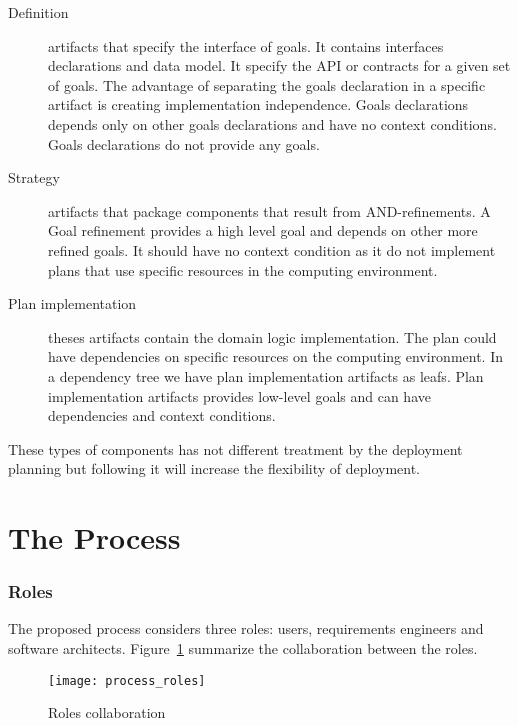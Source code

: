 \begin{description}
  \item[Definition] artifacts that specify the interface of goals. It contains interfaces declarations and data model. It specify the API or contracts for a given set of goals.
  The advantage of separating the goals declaration in a specific artifact is creating implementation independence.
  Goals declarations depends only on other goals declarations and have no context conditions. Goals declarations do not provide any goals.

  \item[Strategy] artifacts that package components that result from AND-refinements. A Goal refinement provides a high level goal and depends on other more refined goals. It should have no context condition as it do not implement plans that use specific resources in the computing environment.

  \item[Plan implementation] theses artifacts contain the domain logic implementation. The plan could have dependencies on specific resources on the computing environment. In a dependency tree we have plan implementation artifacts as leafs.
  Plan implementation artifacts provides low-level goals and can have dependencies and context conditions.

\end{description}

These types of components has not different treatment by the deployment planning but following it will increase the flexibility of deployment.


\section{The Process}

\subsubsection{Roles}
The proposed process considers three roles: users, requirements engineers and software architects.
Figure~\ref{fig:process_roles} summarize the collaboration between the roles.

 \begin{figure}[!htb]
   \centering
   \texttt{[image: process\_roles]}
   \caption{Roles collaboration}
 \label{fig:process_roles}
 \end{figure}

